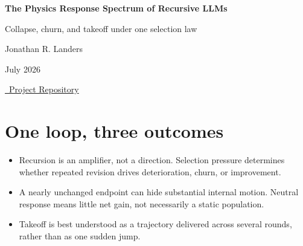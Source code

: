 \documentclass[10pt]{article}
\begin{document}
\begin{center}
{\LARGE \bfseries The Physics Response Spectrum of Recursive LLMs\par}
\vspace{0.15em}
{\large Collapse, churn, and takeoff under one selection law\par}
\vspace{0.75em}
{\large Jonathan R. Landers\par}
\vspace{0.25em}
{July 2026\par}
\vspace{0.15em}
{\small\href{https://github.com/jonland82/finite-response-kernels}{\faGithub\ Project Repository}\par}
\end{center}

\vspace{0.35em}

\begin{abstract}
Recursive revision is often discussed as if repetition itself determined the outcome. We make its direction a controlled variable. Fixed-weight Amazon Nova Lite solves 31 difficult PHYBench problems in populations of four, revises selected solutions for six rounds, and resamples children with pressure $\rho\in\{-6,-2,0,2,6\}$. One scalar law produces a statistically resolved spectrum: mean expression fitness falls from $0.0749$ to $0.0257$ at $\rho=-6$, remains near baseline at $\rho=0$, and rises to $0.1939$ at $\rho=2$. Exact population accuracy independently rises from $1.21\%$ to $8.87\%$. A signed takeoff kernel records when response arrives; total response separates monotone gain from churn. Matched restart and frozen-context controls show that selection alone helps, while inherited revision amplifies the positive branch. Selection supplies direction, recursion mediates it, and takeoff is the finite response of their composition.
\end{abstract}

\section{One loop, three outcomes}

\begin{conceptbox}
\begin{itemize}[leftmargin=1.15em,itemsep=0.18em,topsep=0.05em]
\item Recursion is an amplifier, not a direction. Selection pressure determines whether repeated revision drives deterioration, churn, or improvement.
\item A nearly unchanged endpoint can hide substantial internal motion. Neutral response means little net gain, not necessarily a static population.
\item Takeoff is best understood as a trajectory delivered across several rounds, rather than as one sudden jump.
\end{itemize}
\end{conceptbox}
\end{document}
